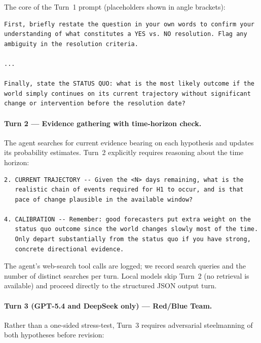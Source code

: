 \documentclass{article} %
\begin{document}
The core of the Turn~1 prompt (placeholders shown in angle brackets):

\begin{small}
\begin{verbatim}
First, briefly restate the question in your own words to confirm your
understanding of what constitutes a YES vs. NO resolution. Flag any
ambiguity in the resolution criteria.

...

Finally, state the STATUS QUO: what is the most likely outcome if the
world simply continues on its current trajectory without significant
change or intervention before the resolution date?
\end{verbatim}
\end{small}

\paragraph{Turn 2 --- Evidence gathering with time-horizon check.}
The agent searches for current evidence bearing on each hypothesis and updates its
probability estimates.  Turn~2 explicitly requires reasoning about the time horizon:

\begin{small}
\begin{verbatim}
2. CURRENT TRAJECTORY -- Given the <N> days remaining, what is the
   realistic chain of events required for H1 to occur, and is that
   pace of change plausible in the available window?

4. CALIBRATION -- Remember: good forecasters put extra weight on the
   status quo outcome since the world changes slowly most of the time.
   Only depart substantially from the status quo if you have strong,
   concrete directional evidence.
\end{verbatim}
\end{small}

The agent's web-search tool calls are logged; we record search queries and the number of
distinct searches per turn.  Local models skip Turn~2 (no retrieval is available) and
proceed directly to the structured JSON output turn.

\paragraph{Turn 3 (GPT-5.4 and DeepSeek only) --- Red/Blue Team.}
Rather than a one-sided stress-test, Turn~3 requires adversarial steelmanning of both
hypotheses before revision:
\end{document}
